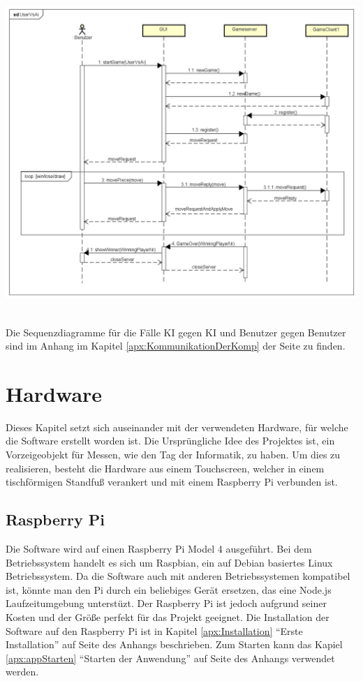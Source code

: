 \documentclass[12pt,a4paper,bibliography=totocnumbered,listof=totocnumbered]{article}
\begin{document}
\vspace{1em}
\begin{minipage}{\linewidth}
	\centering
	\includegraphics[width=0.83\linewidth]{pics/UserVsAiCommunication.png}
	\label{fig:UserVsUserSequenceDiagram}
\end{minipage}
\\

Die Sequenzdiagramme für die Fälle \ac{KI} gegen \ac{KI} und Benutzer gegen Benutzer sind im Anhang im Kapitel \ref{apx:KommunikationDerKomp} 
der Seite \pageref{apx:KommunikationDerKomp} zu finden.

\pagebreak

\section{Hardware}
Dieses Kapitel setzt sich auseinander mit der verwendeten Hardware, für welche die Software erstellt worden ist. 
Die Ursprüngliche Idee des Projektes ist, ein Vorzeigeobjekt für Messen, wie den Tag der Informatik, zu haben.
Um dies zu realisieren, besteht die Hardware aus einem Touchscreen, welcher in einem tischförmigen Standfuß verankert 
und mit einem Raspberry Pi verbunden ist.

\subsection{Raspberry Pi}
Die Software wird auf einen Raspberry Pi Model 4 ausgeführt. Bei dem Betriebssystem handelt es sich um 
Raspbian, ein auf Debian basiertes Linux Betriebssystem. \cite{RaspberryPi} Da die Software auch mit anderen Betriebssystemen
kompatibel ist, könnte man den Pi durch ein beliebiges Gerät ersetzen, das eine Node.js Laufzeitumgebung unterstüzt.
Der Raspberry Pi ist jedoch aufgrund seiner Kosten und der Größe perfekt für das Projekt geeignet.
Die Installation der Software auf den Raspberry Pi ist in Kapitel \ref{apx:Installation} ``Erste Installation'' auf Seite \pageref{apx:Installation} des Anhangs beschrieben.
Zum Starten kann das Kapiel \ref{apx:appStarten} ``Starten der Anwendung'' auf Seite \pageref{apx:appStarten} des Anhangs verwendet werden.
\end{document}
